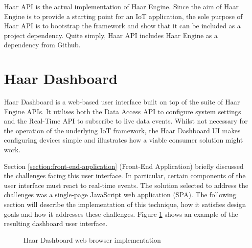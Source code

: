    Haar API is the actual implementation of Haar Engine. Since the aim of Haar Engine is to provide a starting point for an IoT application, the sole purpose of Haar API is to bootstrap the framework and show that it can be included as a project dependency. Quite simply, Haar API includes Haar Engine as a dependency from Github.

  \section{Haar Dashboard}
    Haar Dashboard is a web-based user interface built on top of the suite of Haar Engine APIs. It utilises both the Data Access API to configure system settings and the Real-Time API to subscribe to live data events. Whilst not necessary for the operation of the underlying IoT framework, the Haar Dashboard UI makes configuring devices simple and illustrates how a viable consumer solution might work.

    Section \ref{section:front-end-application} (Front-End Application) briefly discussed the challenges facing this user interface. In particular, certain components of the user interface must react to real-time events. The solution selected to address the challenges was a single-page JavaScript web application (SPA). The following section will describe the implementation of this technique, how it satisfies design goals and how it addresses these challenges. Figure \ref{figure:haar-dashboard} shows an example of the resulting dashboard user interface.

    \begin{figure}
      \centering
      \caption{Haar Dashboard web browser implementation}
      \label{figure:haar-dashboard}
    \end{figure}

